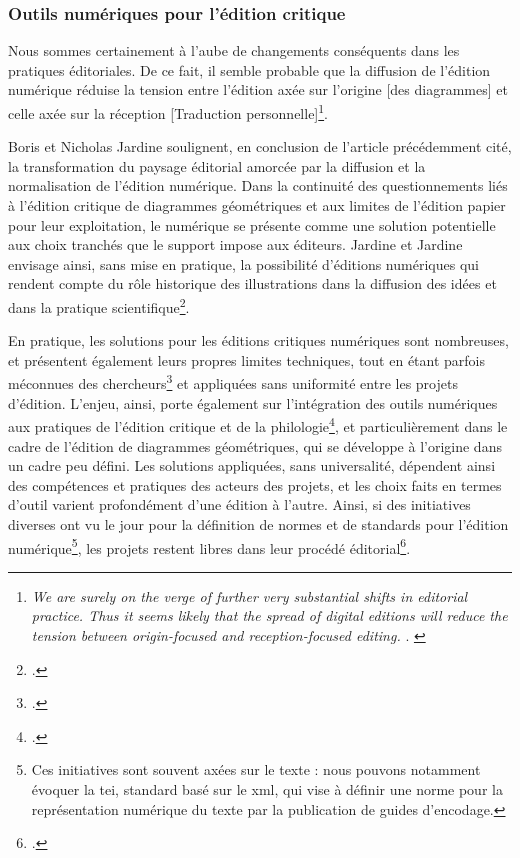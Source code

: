         \subsubsection{Outils numériques pour l'édition critique}
		\begin{displayquote}
			Nous sommes certainement à l'aube de changements conséquents dans les pratiques éditoriales. De ce fait, il semble probable que la diffusion de l'édition numérique réduise la tension entre l'édition axée sur l'origine [des diagrammes] et celle axée sur la réception [Traduction personnelle]\footnote{\textit{\og 			We are surely on the verge of further very substantial shifts in editorial practice. Thus it seems likely that the spread of digital editions will reduce the tension between origin-focused and reception-focused editing. \fg}. \cite{jardineCriticalEditingEarlyModern2010}}.
		\end{displayquote}
	
		Boris et Nicholas Jardine soulignent, en conclusion de l'article précédemment cité, la transformation du paysage éditorial amorcée par la diffusion et la normalisation de l'édition numérique. Dans la continuité des questionnements liés à l'édition critique de diagrammes géométriques et aux limites de l'édition papier pour leur exploitation, le numérique se présente comme une solution potentielle aux choix tranchés que le support impose aux éditeurs. Jardine et Jardine envisage ainsi, sans mise en pratique, la possibilité d'éditions numériques qui rendent compte du rôle historique des illustrations dans la diffusion des idées et dans la pratique scientifique\footcite{jardineCriticalEditingEarlyModern2010}.
		
		En pratique, les solutions pour les éditions critiques numériques sont nombreuses, et présentent également leurs propres limites techniques, tout en étant parfois méconnues des chercheurs\footcite{apollonDigitalCriticalEditions2014} et appliquées sans uniformité entre les projets d'édition. L'enjeu, ainsi, porte également sur l'intégration des outils numériques aux pratiques de l'édition critique et de la philologie\footcite{apollonDigitalCriticalEditions2014}, et particulièrement dans le cadre de l'édition de diagrammes géométriques, qui se développe à l'origine dans un cadre peu défini. Les solutions appliquées, sans universalité, dépendent ainsi des compétences et pratiques des acteurs des projets, et les choix faits en termes d'outil varient profondément d'une édition à l'autre. Ainsi, si des initiatives diverses ont vu le jour pour la définition de normes et de standards pour l'édition numérique\footnote{Ces initiatives sont souvent axées sur le texte : nous pouvons notamment évoquer la \acrfull{tei}, standard basé sur le \acrshort{xml}, qui vise à définir une norme pour la représentation numérique du texte par la publication de guides d'encodage.}, les projets restent libres dans leur procédé éditorial\footcite{apollonDigitalCriticalEditions2014}.
		
